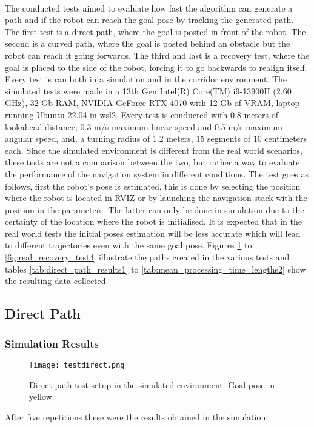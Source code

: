 \paragraph{}The conducted tests aimed to evaluate 
 how fast the algorithm can generate a path and if the robot can reach the goal 
pose by tracking the generated path. The first test is a direct path, where the goal is 
posted in front of the robot. The second is a curved path, where the goal is posted 
behind an obstacle but the robot can reach it going forwards. The third and last 
is a recovery test, where the goal is placed to the side of the robot, forcing 
it to go backwards to realign itself. Every test is ran both in a simulation and 
in the corridor environment.
The simulated tests were made in a 13th Gen Intel(R) Core(TM) i9-13900H (2.60 GHz), 32 Gb RAM, 
NVIDIA GeForce RTX 4070 with 12 Gb of VRAM, laptop running Ubuntu 22.04 in wsl2.
Every test is conducted with 0.8 meters of lookahead distance, 0.3 m/s maximum linear 
speed and 0.5 m/s maximum angular speed, and, 
a turning radius of 1.2 meters, 15 segments of 10 centimeters each.
Since the simulated environment is different from the real world scenarios, 
these tests are not a comparison between the two, but rather a way to evaluate 
the performance of the navigation system in different conditions.
The test goes as follows, first the robot's pose is estimated, this is done by selecting 
the position where the robot is located in RVIZ or by launching the 
navigation stack with the position in the parameters. The latter can only be done 
in simulation due to the certainty of the location where the robot is initialised. It is 
expected that in the real world tests the initial poses estimation will be less 
accurate which will lead to different trajectories even with the same goal pose. Figures \ref{fig:direct_path} 
to \ref{fig:real_recovery_test4} illustrate the paths created in the various tests and tables 
\ref{tab:direct_path_results1} to \ref{tab:mean_processing_time_lengths2} show the resulting data collected.

\subsection{Direct Path}
\label{subsec:direct_path}
\subsubsection{Simulation Results}

\begin{figure}[h]
    \centering
    \texttt{[image: testdirect.png]}
    \caption{Direct path test setup in the simulated environment. Goal pose in yellow.}
    \label{fig:direct_path}
\end{figure}
After five repetitions these were the results obtained in the simulation:

